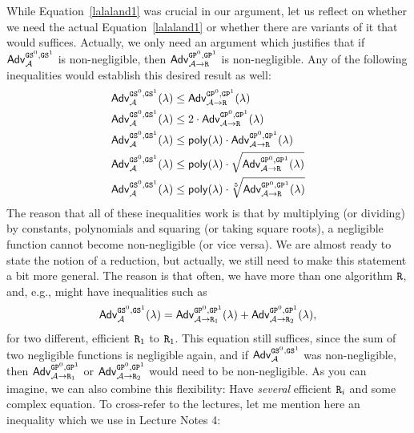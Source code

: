 While Equation~\ref{lalaland1} was crucial in our argument, let us reflect on whether we need the actual Equation~\ref{lalaland1} or whether there are variants of it that would suffices. Actually, we only need an argument which justifies that if $\mathsf{Adv}^{\text{\texttt{GS}}^0,\text{\texttt{GS}}^1}_{\mathcal{A}}$ is non-negligible, then $\mathsf{Adv}^{\text{\texttt{GP}}^0,\text{\texttt{GP}}^1}_{\mathcal{A}\rightarrow\text{\texttt{R}}}$ is non-negligible. Any of the following inequalities would establish this desired result as well:
\begin{align*}
\mathsf{Adv}^{\text{\texttt{GS}}^0,\text{\texttt{GS}}^1}_{\mathcal{A}}(\lambda)&\leq\mathsf{Adv}^{\text{\texttt{GP}}^0,\text{\texttt{GP}}^1}_{\mathcal{A}\rightarrow\text{\texttt{R}}}(\lambda)\\
\mathsf{Adv}^{\text{\texttt{GS}}^0,\text{\texttt{GS}}^1}_{\mathcal{A}}(\lambda)&\leq 2\cdot\mathsf{Adv}^{\text{\texttt{GP}}^0,\text{\texttt{GP}}^1}_{\mathcal{A}\rightarrow\text{\texttt{R}}}(\lambda)\\
\mathsf{Adv}^{\text{\texttt{GS}}^0,\text{\texttt{GS}}^1}_{\mathcal{A}}(\lambda)&\leq \mathsf{poly}(\lambda)\cdot\mathsf{Adv}^{\text{\texttt{GP}}^0,\text{\texttt{GP}}^1}_{\mathcal{A}\rightarrow\text{\texttt{R}}}(\lambda)\\
\mathsf{Adv}^{\text{\texttt{GS}}^0,\text{\texttt{GS}}^1}_{\mathcal{A}}(\lambda)&\leq \mathsf{poly}(\lambda)\cdot\sqrt{\mathsf{Adv}^{\text{\texttt{GP}}^0,\text{\texttt{GP}}^1}_{\mathcal{A}\rightarrow\text{\texttt{R}}}(\lambda)}\\
\mathsf{Adv}^{\text{\texttt{GS}}^0,\text{\texttt{GS}}^1}_{\mathcal{A}}(\lambda)&\leq \mathsf{poly}(\lambda)\cdot\sqrt[5]{\mathsf{Adv}^{\text{\texttt{GP}}^0,\text{\texttt{GP}}^1}_{\mathcal{A}\rightarrow\text{\texttt{R}}}(\lambda)}
\end{align*}
The reason that all of these inequalities work is that by multiplying (or dividing) by constants, polynomials and squaring (or taking square roots), a negligible function cannot become non-negligible (or vice versa). We are almost ready to state the notion of a reduction, but actually, we still need to make this statement a bit more general. The reason is that often, we have more than one algorithm $\text{\texttt{R}}$, and, e.g., might have inequalities such as 
\begin{equation}\label{lalaland12}
\mathsf{Adv}^{\text{\texttt{GS}}^0,\text{\texttt{GS}}^1}_{\mathcal{A}}(\lambda)=\mathsf{Adv}^{\text{\texttt{GP}}^0,\text{\texttt{GP}}^1}_{\mathcal{A}\rightarrow\text{\texttt{R}}_1}(\lambda)+\mathsf{Adv}^{\text{\texttt{GP}}^0,\text{\texttt{GP}}^1}_{\mathcal{A}\rightarrow\text{\texttt{R}}_2}(\lambda),
\end{equation}
for two different, efficient $\text{\texttt{R}}_1$ to $\text{\texttt{R}}_1$. This equation still suffices, since the sum of two negligible functions is negligible again, and if $\mathsf{Adv}^{\text{\texttt{GS}}^0,\text{\texttt{GS}}^1}_{\mathcal{A}}$ was non-negligible, then $\mathsf{Adv}^{\text{\texttt{GP}}^0,\text{\texttt{GP}}^1}_{\mathcal{A}\rightarrow\text{\texttt{R}}_1}$ or 
$\mathsf{Adv}^{\text{\texttt{GP}}^0,\text{\texttt{GP}}^1}_{\mathcal{A}\rightarrow\text{\texttt{R}}_2}$ would need to be non-negligible. As you can imagine, we can also combine this flexibility: Have \emph{several} efficient $\text{\texttt{R}}_i$ and some complex equation. To cross-refer to the lectures, let me mention here an inequality which we use in Lecture Notes 4:
